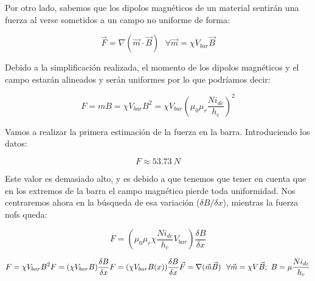 Por otro lado, sabemos que los dipolos magnéticos de un material sentirán una fuerza al verse sometidos a un campo no uniforme de forma: 

$$
\vec F=\nabla(\vec m \cdot\vec B)~~~\forall \vec m=\chi V_{bar}\vec B
$$

Debido a la simplificación realizada, el momento de los dipolos magnéticos y el campo estarán alineados y serán uniformes por lo que podríamos decir:

$$
F=mB=\chi V_{bar}B^2=\chi V_{bar}(\mu_0\mu_r\frac{Ni_{dc}}{h_c})^2
$$

Vamos a realizar la primera estimación de la fuerza en la barra. Introduciendo los datos: 

$$
F\approx53.73~N
$$

Este valor es demasiado alto, y es debido a que tenemos que tener en cuenta que en los extremos de la barra el campo magnético pierde toda uniformidad. Nos centraremos ahora en la búsqueda de esa variación ($\delta B/\delta x$), mientras la fuerza nofs queda:

$$
F=(\mu_0\mu_r\chi\frac{Ni_{dc}}{h_c}V_{bar})\frac{\delta B}{\delta x}
$$

$$
F=\chi V_{bar}B^2
\\~\\
F=(\chi V_{bar} B)\frac{\delta B}{\delta x}
\\~\\
F=(\chi V_{bar}B(x))\frac{\delta B}{\delta x}
\\~\\
\vec{F}=\nabla(\vec m\vec B)~~\forall \vec m=\chi V \vec B;~B=\mu\frac{Ni_{dc}}{h_c}
$$